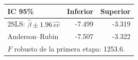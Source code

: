 
\begin{tabular}{lrr}
\toprule
IC 95\% & Inferior & Superior\\
\midrule
2SLS: $\hat\beta\pm 1.96\,\widehat{ee}$ & -7.499 & -3.319\\
Anderson--Rubin & -7.507 & -3.322\\
\midrule
\multicolumn{3}{l}{$F$ robusto de la primera etapa: 1253.6.}\\
\bottomrule
\end{tabular}
